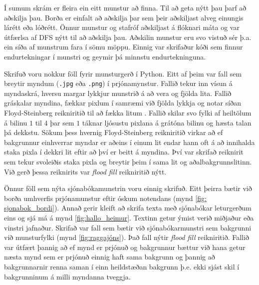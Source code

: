 Í sumum skrám er fleira ein eitt munstur að finna. Til að geta nýtt þau þarf að aðskilja þau. Borða er einfalt að aðskilja þar sem þeir aðskiljast alveg einungis lárétt eða lóðrétt. Önnur munstur og stafróf aðskiljast á flóknari máta og var útfærlsa af DFS nýtt til að aðskilja þau. Aðskilin munstur eru svo vistuð sér þ.a. ein síða af munstrum fara í sömu möppu. Einnig var skrifaður kóði sem finnur endurtekningar í munstri og geymir þá minnstu endurtekninguna.

Skrifuð voru nokkur föll fyrir munsturgerð í Python. Eitt af þeim var fall sem breytir myndum (\texttt{.jpg} eða \texttt{.png}) í prjónamynstur. Fallið tekur inn vísun á myndaskrá, hversu margar lykkjur munstrið á að vera og fjölda lita. Fallið gráskalar myndina, fækkar pixlum í samræmi við fjölda lykkja og notar síðan Floyd-Steinberg reikniritið til að fækka litum \cite{FloydSteinberg}. Fallið skilar svo fylki af heiltölum á bilinu $1$ til $4$ þar sem $1$ táknar ljósustu pixlana á grátóna bilinu og hæsta talan þá dekkstu. Sökum þess hvernig Floyd-Steinberg reikniritið virkar að ef bakgrunnur einhverrar myndar er aðeins í einum lit endar hann oft á að innihalda staka pixla í dekkri lit eftir að því er beitt á myndina. Því var skrifað reiknirit sem tekur svoleiðis staka pixla og breytir þeim í sama lit og aðalbakgrunnslitinn. Við gerð þessa reiknirits var \textit{flood fill} reikniritið nýtt.

Önnur föll sem nýta sjónabókamunstrin voru einnig skrifuð. Eitt þeirra bætir við borða umhverfis prjónamunstur eftir óskum notendans (mynd \ref{fig: sjonabok_bordi}). Annað gerir kleift að skrifa texta með sjónabókar leturgerðum eins og sjá má á mynd \ref{fig:hallo_heimur}. Textinn getur ýmist verið  miðjaður eða vinstri jafnaður. Skrifað var fall sem bætir við sjónabókarmunstri sem bakgrunni við munsturfylki (mynd \ref{fig:raggajóns}). Það fall nýtir \textit{flood fill} reikniritið. Fallið var útfært þannig að ef mynd er prjónuð og bakgrunnur bættur við hana getur næsta mynd sem er prjónuð einnig haft sama bakgrunn og þannig að bakgrunnarnir renna saman í einn heildstæðan bakgrunn þ.e. ekki sjást skil í bakgrunninum á milli myndanna tveggja.


